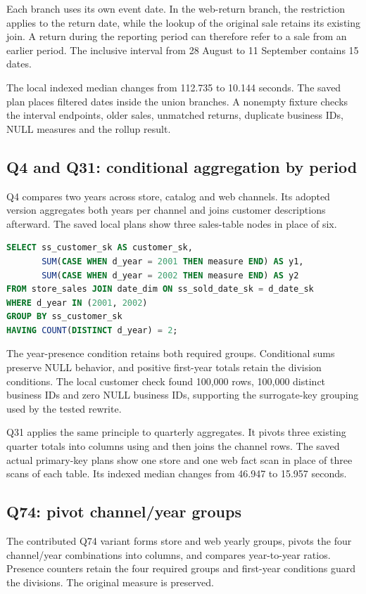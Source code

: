 \documentclass[11pt,a4paper]{article}
\DeclareRobustCommand{\file}[1]{\path{#1}}
\begin{document}
Each branch uses its own event date. In the web-return branch, the restriction
applies to the return date, while the lookup of the original sale retains its
existing join. A return during the reporting period can therefore refer to a
sale from an earlier period. The inclusive interval from 28 August to
11 September contains 15 dates.

The local indexed median changes from 112.735 to 10.144 seconds. The saved
plan places filtered dates inside the union branches. A nonempty fixture
checks the interval endpoints, older sales, unmatched returns, duplicate
business IDs, NULL measures and the rollup result.

\subsection{Q4 and Q31: conditional aggregation by period}
Q4 compares two years across store, catalog and web channels. Its adopted
version aggregates both years per channel and joins customer descriptions
afterward. The saved local plans show three sales-table nodes in place of six.

\begin{lstlisting}[language=SQL,caption={Q4 conditional-aggregation pattern. The full query retains the original financial expression and denominator conditions.}]
SELECT ss_customer_sk AS customer_sk,
       SUM(CASE WHEN d_year = 2001 THEN measure END) AS y1,
       SUM(CASE WHEN d_year = 2002 THEN measure END) AS y2
FROM store_sales JOIN date_dim ON ss_sold_date_sk = d_date_sk
WHERE d_year IN (2001, 2002)
GROUP BY ss_customer_sk
HAVING COUNT(DISTINCT d_year) = 2;
\end{lstlisting}

The year-presence condition retains both required groups. Conditional sums
preserve NULL behavior, and positive first-year totals retain the division
conditions. The local customer check found 100,000 rows, 100,000 distinct
business IDs and zero NULL business IDs, supporting the surrogate-key grouping
used by the tested rewrite.

Q31 applies the same principle to quarterly aggregates. It pivots three
existing quarter totals into columns using \file{MAX(CASE ...)} and then joins
the channel rows. The saved actual primary-key plans show one store and one
web fact scan in place of three scans of each table. Its indexed median changes
from 46.947 to 15.957 seconds.

\subsection{Q74: pivot channel/year groups}
The contributed Q74 variant forms store and web yearly groups, pivots the four
channel/year combinations into columns, and compares year-to-year ratios.
Presence counters retain the four required groups and first-year conditions
guard the divisions. The original \file{MAX(net_paid)} measure is preserved.
\end{document}
